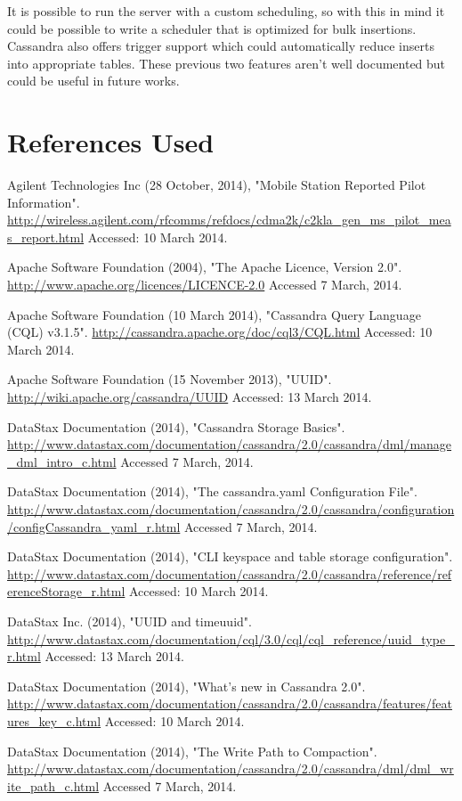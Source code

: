 \documentclass[letterpaper]{article}
\begin{document}
It is possible to run the server with a custom scheduling, so with this in mind it could be possible
to write a scheduler that is optimized for bulk insertions.
Cassandra also offers trigger support which could automatically reduce inserts into
appropriate tables. These previous two features aren't well documented but could be useful in future
works.

\section{References Used}

Agilent Technologies Inc (28 October, 2014), "Mobile Station Reported Pilot Information".
\url{http://wireless.agilent.com/rfcomms/refdocs/cdma2k/c2kla_gen_ms_pilot_meas_report.html}
Accessed: 10 March 2014.

Apache Software Foundation (2004), "The Apache Licence, Version 2.0".
\url{http://www.apache.org/licences/LICENCE-2.0}
Accessed 7 March, 2014.

Apache Software Foundation (10 March 2014), "Cassandra Query Language (CQL) v3.1.5".
\url{http://cassandra.apache.org/doc/cql3/CQL.html}
Accessed: 10 March 2014.

Apache Software Foundation (15 November 2013), "UUID".
\url{http://wiki.apache.org/cassandra/UUID}
Accessed: 13 March 2014.

DataStax Documentation (2014), "Cassandra Storage Basics".
\url{http://www.datastax.com/documentation/cassandra/2.0/cassandra/dml/manage_dml_intro_c.html}
Accessed 7 March, 2014.

DataStax Documentation (2014), "The cassandra.yaml Configuration File".
\url{http://www.datastax.com/documentation/cassandra/2.0/cassandra/configuration/configCassandra_yaml_r.html}
Accessed 7 March, 2014.  

DataStax Documentation (2014), "CLI keyspace and table storage configuration".
\url{http://www.datastax.com/documentation/cassandra/2.0/cassandra/reference/referenceStorage_r.html}
Accessed: 10 March 2014.

DataStax Inc. (2014), "UUID and timeuuid".
\url{http://www.datastax.com/documentation/cql/3.0/cql/cql_reference/uuid_type_r.html}
Accessed: 13 March 2014.

DataStax Documentation (2014), "What's new in Cassandra 2.0".
\url{http://www.datastax.com/documentation/cassandra/2.0/cassandra/features/features_key_c.html}
Accessed: 10 March 2014.

DataStax Documentation (2014), "The Write Path to Compaction".
\url{http://www.datastax.com/documentation/cassandra/2.0/cassandra/dml/dml_write_path_c.html}
Accessed 7 March, 2014.
\end{document}
